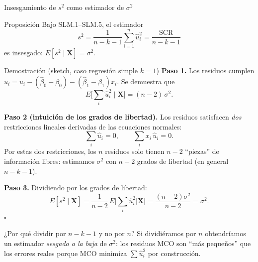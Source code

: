 \documentclass[10pt]{beamer}
\begin{document}
\begin{frame}[allowframebreaks]{Insesgamiento de $s^2$ como estimador de $\sigma^2$}

\begin{alertblock}{Proposición}
Bajo SLM.1--SLM.5, el estimador
\[
s^2=\frac{1}{n-k-1}\sum_{i=1}^{n}\hat u_i^2=\frac{\text{SCR}}{n-k-1}
\]
es insesgado: $E[s^2\mid\mathbf{X}]=\sigma^2$.
\end{alertblock}

\begin{exampleblock}{Demostración (sketch, caso regresión simple $k=1$)}
\textbf{Paso 1.} Los residuos cumplen $\hat u_i=u_i-(\hat\beta_0-\beta_0)-(\hat\beta_1-\beta_1)x_i$. Se demuestra que
\[
E\!\Big[\sum_i \hat u_i^2 \;\Big|\;\mathbf{X}\Big]=(n-2)\,\sigma^2.
\]

\framebreak

\textbf{Paso 2 (intuición de los grados de libertad).} Los residuos satisfacen \emph{dos} restricciones lineales derivadas de las ecuaciones normales:
\[
\sum_i \hat u_i=0, \qquad \sum_i x_i\,\hat u_i=0.
\]
Por estas dos restricciones, los $n$ residuos solo tienen $n-2$ ``piezas'' de información libres: estimamos $\sigma^2$ con $n-2$ grados de libertad (en general $n-k-1$).

\textbf{Paso 3.} Dividiendo por los grados de libertad:
\[
E[s^2\mid\mathbf{X}]=\frac{1}{n-2}\,E\!\Big[\sum_i\hat u_i^2\Big|\mathbf{X}\Big]=\frac{(n-2)\sigma^2}{n-2}=\sigma^2.
\]
\hfill $\square$
\end{exampleblock}

\begin{block}{¿Por qué dividir por $n-k-1$ y no por $n$?}
Si dividiéramos por $n$ obtendríamos un estimador \emph{sesgado a la baja} de $\sigma^2$: los residuos MCO son ``más pequeños'' que los errores reales porque MCO minimiza $\sum\hat u_i^2$ por construcción.
\end{block}

\end{frame}
\end{document}
